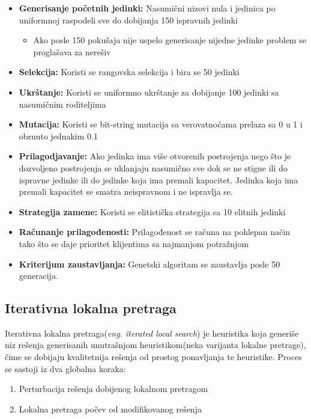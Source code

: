 \documentclass[a4paper]{article}
\begin{document}
\begin{itemize}
\item \textbf{Generisanje početnih jedinki:} Nasumični nizovi nula i jedinica po uniformnoj raspodeli sve do dobijanja 150 ispravnih jedinki
	\begin{itemize}
		\item Ako posle 150 pokušaja nije uspelo generisanje nijedne jedinke problem se proglašava za nerešiv
	\end{itemize}
\item \textbf{Selekcija:} Koristi se rangovska selekcija i bira se 50 jedinki
\item \textbf{Ukrštanje:} Koristi se uniformno ukrštanje za dobijanje 100 jedinki sa nasumičnim roditeljima
\item \textbf{Mutacija:} Koristi se bit-string mutacija sa verovatnoćama prelaza sa 0 u 1 i obrnuto jednakim 0.1
\item \textbf{Prilagodjavanje:} Ako jedinka ima više otvorenih postrojenja nego što je dozvoljeno postrojenja se uklanjaju nasumično sve dok se ne stigne ili do ispravne jedinke ili do jedinke koja ima premali kapacitet. Jedinka koja ima premali kapacitet se smatra neispravnom i ne ispravlja se.
\item \textbf{Strategija zamene:} Koristi se elitistička strategija sa 10 elitnih jedinki
\item \textbf{Računanje prilagođenosti:}  Prilagođenost se računa na pohlepan način tako što se daje prioritet klijentima sa najmanjom potražnjom
\item \textbf{Kriterijum zaustavljanja:} Genetski algoritam se zaustavlja posle 50 generacija.
\end{itemize}

\subsection{Iterativna lokalna pretraga}

Iterativna lokalna pretraga(\emph{eng. iterated local search}) je heuristika koja generiše niz rešenja generisanih unutrašnjom heuristikom(neka varijanta lokalne pretrage), čime se dobijaju kvalitetnija rešenja od prostog ponavljanja te heuristike\cite{lourenccoils}. 
Proces se sastoji iz dva globalna koraka:
\begin{enumerate}
\item Perturbacija rešenja dobijenog lokalnom pretragom
\item Lokalna pretraga počev od modifikovanog rešenja
\end{enumerate}
\end{document}
